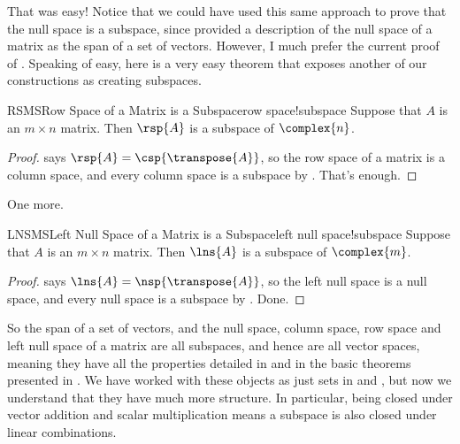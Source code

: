 %
That was easy!  Notice that we could have used this same approach to prove that the null space is a subspace, since  provided a description of the null space of a matrix as the span of a set of vectors.  However, I much prefer the current proof of .  Speaking of easy, here is a very easy theorem that exposes another of our constructions as creating subspaces.\par
%
\begin{theorem}{RSMS}{Row Space of a Matrix is a Subspace}{row space!subspace}
Suppose that $A$ is an $m\times n$ matrix.  Then $\rsp{A}$ is a subspace of $\complex{n}$.
\end{theorem}
%
\begin{proof}
 says $\rsp{A}=\csp{\transpose{A}}$, so the row space of a matrix is a column space, and every column space is a subspace by .  That's enough.
\end{proof}
%
One more.
%
\begin{theorem}{LNSMS}{Left Null Space of a Matrix is a Subspace}{left null space!subspace}
Suppose that $A$ is an $m\times n$ matrix.  Then $\lns{A}$ is a subspace of $\complex{m}$.
\end{theorem}
%
\begin{proof}
 says $\lns{A}=\nsp{\transpose{A}}$, so the left null space is a null space, and every null space is a subspace by .  Done.
\end{proof}
%
So the span of a set of vectors, and the null space, column space, row space and left null space of a matrix are all subspaces, and hence are all vector spaces, meaning they have all the properties detailed in  and in the basic theorems presented in .  We have worked with these objects as just sets in  and , but now we understand that they have much more structure.  In particular, being closed under vector addition and scalar multiplication means a subspace is also closed under linear combinations.
%

